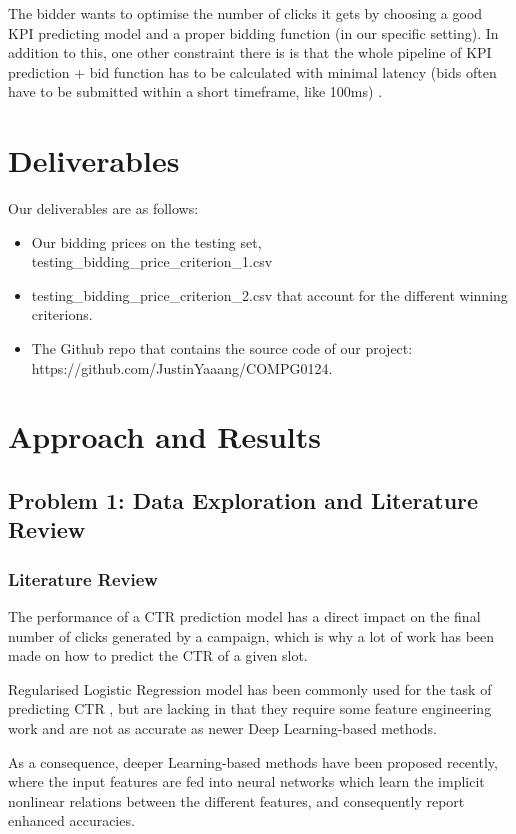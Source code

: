 \documentclass{sig-alternate-05-2015}
\begin{document}
The bidder wants to optimise the number of clicks it gets by choosing a good KPI predicting model and a proper bidding function (in our specific setting).
In addition to this, one other constraint there is is that the whole pipeline of KPI prediction + bid function has to be calculated with minimal latency (bids often have to be submitted within a short timeframe, like 100ms) \cite{MILLI, PHD1}.

\section{Deliverables}

Our deliverables are as follows:
\begin{itemize}
  \item Our bidding prices on the testing set, \\
  testing\_bidding\_price\_criterion\_1.csv
  \item testing\_bidding\_price\_criterion\_2.csv that account for the different winning criterions.
  \item The Github repo that contains the source code of our project: https://github.com/JustinYaaang/COMPG0124.
\end{itemize}

\section{Approach and Results}

\subsection{Problem 1: Data Exploration and Literature Review}

\subsubsection{Literature Review}


The performance of a CTR prediction model has a direct impact on the final number of clicks generated by a campaign,
which is why a lot of work has been made on how to predict the CTR of a given slot.

Regularised Logistic Regression model has been commonly used for the task of predicting CTR \cite{LOGREG1}, but are lacking in that they require some feature engineering work and are not as accurate as newer Deep Learning-based methods. \cite{DL1}

As a consequence, deeper Learning-based methods have been proposed recently, where the input features are fed into neural networks which learn the implicit nonlinear relations between the different features, and consequently report enhanced accuracies. \cite{DL2, DL3, DL5}
\end{document}
